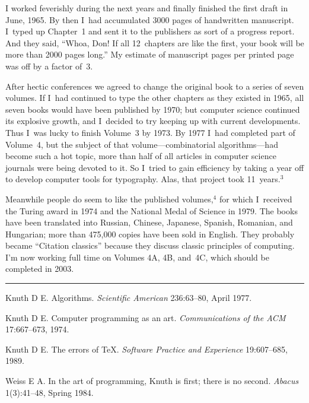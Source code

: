 I worked feverishly during the next years and finally finished the
first draft in June, 1965. By then I~had accumulated 3000 pages of
handwritten manuscript. I~typed up Chapter~1 and sent it to the
publishers as sort of a progress report. And they said, ``Whoa, Don!
If all 12~chapters are like the first, your book will be more than
2000 pages long.'' My estimate of  manuscript pages per printed page
was off by a factor of~3.

After hectic conferences we agreed to change the original book to a
series of seven volumes. If I~had continued to type the other chapters
as they existed in 1965, all seven books would have been published
by 1970; but computer science continued its explosive growth, and
I~decided to try keeping up with current developments. Thus I~was
lucky to finish Volume~3 by 1973. By 1977 I~had completed part
of Volume~4, but the subject of that volume---combinatorial
algorithms---had become such a hot topic, more than half of all articles
in computer science journals were being devoted to it. So I~tried to
gain efficiency by taking a year off to develop computer tools for
typography. Alas, that project took 11~years.$^3$

Meanwhile people do seem to like the published volumes,$^4$ for which
I~received the Turing award in 1974 and the National Medal of Science
in 1979. The books have been translated into Russian, Chinese,
Japanese, Spanish, Romanian, and Hungarian; more than 475,000 copies
have been sold in English. They probably became ``Citation classics''
because they discuss classic principles of computing. I'm now working
full time on Volumes 4A, 4B, and~4C, which should be completed in
2003.

\bigskip\hrule\bigskip

\bib
Knuth D E. \quad Algorithms. {\sl Scientific American\/}  236:63--80,
April 1977.

\medskip
\bib
Knuth D E. \quad Computer programming as an art. {\sl Communications of the
ACM\/} 17:667--673, 1974.

\medskip
\bib
Knuth D E. \quad The errors of \TeX. {\sl Software Practice and Experience\/}
19:607--685, 1989.

\medskip
\bib
Weiss E A. \quad In the art of programming, Knuth is first; there is no
second. {\sl Abacus\/} 1(3):41--48, Spring 1984.

\bye




